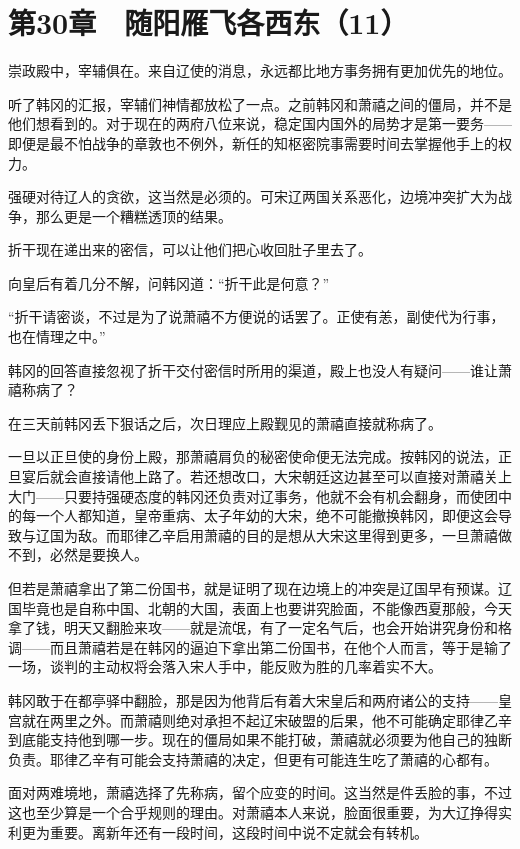 \section{第30章　随阳雁飞各西东（11）}

崇政殿中，宰辅俱在。来自辽使的消息，永远都比地方事务拥有更加优先的地位。 

听了韩冈的汇报，宰辅们神情都放松了一点。之前韩冈和萧禧之间的僵局，并不是他们想看到的。对于现在的两府八位来说，稳定国内国外的局势才是第一要务——即便是最不怕战争的章敦也不例外，新任的知枢密院事需要时间去掌握他手上的权力。 

强硬对待辽人的贪欲，这当然是必须的。可宋辽两国关系恶化，边境冲突扩大为战争，那么更是一个糟糕透顶的结果。 

折干现在递出来的密信，可以让他们把心收回肚子里去了。 

向皇后有着几分不解，问韩冈道：“折干此是何意？” 

“折干请密谈，不过是为了说萧禧不方便说的话罢了。正使有恙，副使代为行事，也在情理之中。” 

韩冈的回答直接忽视了折干交付密信时所用的渠道，殿上也没人有疑问——谁让萧禧称病了？ 

在三天前韩冈丢下狠话之后，次日理应上殿觐见的萧禧直接就称病了。 

一旦以正旦使的身份上殿，那萧禧肩负的秘密使命便无法完成。按韩冈的说法，正旦宴后就会直接请他上路了。若还想改口，大宋朝廷这边甚至可以直接对萧禧关上大门——只要持强硬态度的韩冈还负责对辽事务，他就不会有机会翻身，而使团中的每一个人都知道，皇帝重病、太子年幼的大宋，绝不可能撤换韩冈，即便这会导致与辽国为敌。而耶律乙辛启用萧禧的目的是想从大宋这里得到更多，一旦萧禧做不到，必然是要换人。 

但若是萧禧拿出了第二份国书，就是证明了现在边境上的冲突是辽国早有预谋。辽国毕竟也是自称中国、北朝的大国，表面上也要讲究脸面，不能像西夏那般，今天拿了钱，明天又翻脸来攻——就是流氓，有了一定名气后，也会开始讲究身份和格调——而且萧禧若是在韩冈的逼迫下拿出第二份国书，在他个人而言，等于是输了一场，谈判的主动权将会落入宋人手中，能反败为胜的几率着实不大。 

韩冈敢于在都亭驿中翻脸，那是因为他背后有着大宋皇后和两府诸公的支持——皇宫就在两里之外。而萧禧则绝对承担不起辽宋破盟的后果，他不可能确定耶律乙辛到底能支持他到哪一步。现在的僵局如果不能打破，萧禧就必须要为他自己的独断负责。耶律乙辛有可能会支持萧禧的决定，但更有可能连生吃了萧禧的心都有。 

面对两难境地，萧禧选择了先称病，留个应变的时间。这当然是件丢脸的事，不过这也至少算是一个合乎规则的理由。对萧禧本人来说，脸面很重要，为大辽挣得实利更为重要。离新年还有一段时间，这段时间中说不定就会有转机。 

